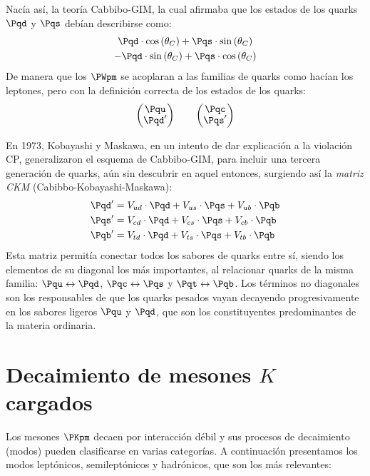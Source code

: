 Nacía así, la teoría Cabbibo-GIM, la cual afirmaba que los estados de los quarks $\Pqd$ y $\Pqs$ debían describirse como:
\begin{equation}
\begin{gathered}
\Pqd \cdot \cos \left( \theta _{C}\right) + \Pqs \cdot \sin \left( \theta _{C}\right) \\
- \Pqd \cdot \sin \left( \theta _{C}\right) + \Pqs \cdot \cos \left( \theta_C\right)
\end{gathered}
\end{equation}
De manera que los $\PWpm$ se acoplaran a las familias de quarks como hacían los leptones, pero con la definición correcta de los estados de los quarks:
\begin{align}
\begingroup 
\renewcommand*{\arraystretch}{0.8}
\setlength\arraycolsep{10pt}
\begin{pmatrix} \Pqu \\ \Pqd' \end{pmatrix} \qquad
\begin{pmatrix} \Pqc \\ \Pqs' \end{pmatrix}
\endgroup
\end{align}

En 1973, Kobayashi y Maskawa, en un intento de dar explicación a la violación CP, generalizaron el esquema de Cabbibo-GIM, para incluir una tercera generación de quarks, aún sin descubrir en aquel entonces, surgiendo así la \textit{matriz CKM} (Cabibbo-Kobayashi-Maskawa):
\begin{align}
\Pqd' &= V_{ud}\cdot \Pqd + V_{us}\cdot \Pqs + V_{ub}\cdot \Pqb \nonumber \\
\Pqs' &= V_{cd}\cdot \Pqd + V_{cs}\cdot \Pqs + V_{cb}\cdot \Pqb \label{eq:CKM}\\
\Pqb' &= V_{td}\cdot \Pqd + V_{ts}\cdot \Pqs + V_{tb}\cdot \Pqb \nonumber
\end{align}
Esta matriz permitía conectar todos los sabores de quarks entre sí, siendo los elementos de su diagonal los más importantes, al relacionar quarks de la misma familia: $\Pqu \leftrightarrow \Pqd$, $\Pqc \leftrightarrow \Pqs$ y $\Pqt \leftrightarrow \Pqb$. Los términos no diagonales son los responsables de que los quarks pesados vayan decayendo progresivamente en los sabores ligeros $\Pqu$ y $\Pqd$, que son los constituyentes predominantes de la materia ordinaria. 

\section{Decaimiento de mesones $K$ cargados}
\label{sec:charged_kaon_decay}
Los mesones $\PKpm$ decaen por interacción débil y sus procesos de decaimiento (modos) pueden clasificarse en varias categorías. A continuación presentamos los modos leptónicos, semileptónicos y hadrónicos, que son los más relevantes:

